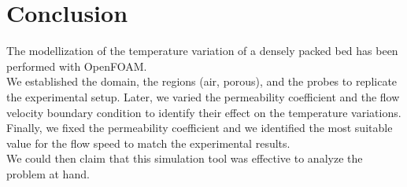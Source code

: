 
\section{Conclusion}
\label{section:cnclusion}

The modellization of the temperature variation of a densely packed bed 
has been performed with OpenFOAM\textregistered.\\
We established the domain, the regions (air, porous), and the probes
to replicate the experimental setup.
Later, we varied the permeability coefficient and the flow velocity boundary
condition to identify their effect on the temperature variations.
Finally, we fixed the permeability coefficient and we identified the most
suitable value for the flow speed to match the experimental results.\\
We could then claim that this simulation tool was effective to analyze the
problem at hand.
